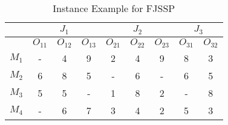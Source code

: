 \begin{table}[tb]
\scriptsize
   \centering
   \caption{Instance Example for FJSSP}
   \label{tab:proccesingTime}%
\begin{tabular}{c|ccc|ccc|cc}
\hline
\multicolumn{1}{l|}{} & \multicolumn{3}{c}{$J_1$} & \multicolumn{3}{c}{$J_2$} & \multicolumn{2}{c}{$J_3$} \\
\hline
\multicolumn{1}{l|}{} & $O_{11}$    & $O_{12}$   & $O_{13}$   & $O_{21}$    & $O_{22}$   & $O_{23}$   & $O_{31}$        & $O_{32}$       \\
\hline
$M_1$                   & -      & 4     & 9     & 2      & 4     & 9     & 8          & 3         \\
$M_2$                   & 6      & 8     & 5     & -      & 6     & -     & 6          & 5         \\
$M_3$                   & 5      & 5     & -     & 1      & 8     & 2     & -          & 8         \\
$M_4$                   & -      & 6     & 7     & 3      & 4     & 2     & 5          & 3        \\
\hline
\end{tabular}
\end{table}
